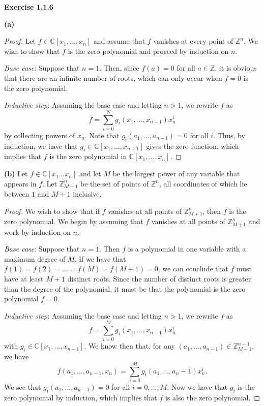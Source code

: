 \documentclass[12pt,oneside]{article}
\newenvironment{exercise}[1]{\vspace{.1in}\noindent\textbf{Exercise #1 \hspace{.05em}}}{}
\newcommand{\C}{\mathbb{C}}
\newcommand{\Z}{\mathbb{Z}}
\begin{document}

\begin{exercise}{1.1.6}

    \bigskip
    \textbf{(a)}
    \begin{proof}
        Let $f \in \C[x_1,\ldots, x_n]$ and assume that $f$ vanishes at every 
        point of $\Z^n$. We wish to show that $f$ is the zero polynomial and 
        proceed by induction on $n$.

        \textit{Base case}: Suppose that $n = 1$. Then, since $f(a) = 0$ for 
        all $a \in \Z$, it is obvious that there are an infinite number of 
        roots, which can only occur when $f = 0$ is the zero polynomial.

        \textit{Inductive step}: Assuming the base case and letting $n > 1$,
        we rewrite $f$ as 
        \[
            f = \sum_{i=0}^Ng_i(x_1,\ldots,x_{n-1})x_n^i
        \]
        by collecting powers of $x_n$. Note that $g_i(a_1,\ldots,a_{n-1}) = 0$
        for all $i$. Thus, by induction, we have that $g_i \in \C[x_1,\ldots,x_{n-1}]$ 
        gives the zero function, which implies that $f$ is the zero polynomial in
        $\C[x_1,\ldots,x_n]$.
    \end{proof}

    \bigskip
    \textbf{(b)}
    Let $f \in \C[x_1\ldots x_n]$ and let $M$ be the largest power of any 
    variable that appears in $f$. Let $\Z_{M+1}^n$ be the set of points of 
    $\Z^n$, all coordinates of which lie between $1$ and $M+1$ inclusive. 

    \begin{proof}
        We wish to show that if $f$ vanishes at all points of $\Z_{M+1}^n$, then 
        $f$ is the zero polynomial. We begin by assuming that $f$ vanishes 
        at all points of $\Z_{M+1}^n$ and work by induction on $n$. 

        \textit{Base case}: Suppose that $n = 1$. Then $f$ is a polynomial 
        in one variable with a maximum degree of $M$. If we have that 
        $f(1) = f(2) = \ldots = f(M) = f(M + 1) = 0$, we can conclude that 
        $f$ must have at least $M + 1$ distinct roots. Since the number of 
        distinct roots is greater than the degree of the polynomial, it must 
        be that the polynomial is the zero polynomial $f = 0$.

        \textit{Inductive step}: Assuming the base case and letting $n > 1$, 
        we rewrite $f$ as
        \[
            f = \sum_{i=0}^M g_i(x_1, \ldots, x_{n-1})x_n^i
        \]
        with $g_i \in \C[x_1, \ldots, x_{n-1}]$. We know then that, for any 
        $(a_1,\ldots, a_{n-1}) \in \Z_{M+1}^{n-1}$, we have 
        \[
            f(a_1,\ldots,a_{n-1}, x_n) = \sum_{i=0}^Mg_i(a_1,\ldots,a_n-1)x_n^i.
        \]
        We see that $g_i(a_1,\ldots,a_{n-1}) = 0$ for all $i = 0,\ldots, M$. 
        Now we have that $g_i$ is the zero polynomial by induction, which 
        implies that $f$ is also the zero polynomial.
    \end{proof}
\end{exercise}



\end{document}
